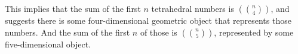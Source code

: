 \documentclass[12pt]{scrippsthesis}
\newcommand{\mchoose}[2]{{\textstyle \left( \! {#1 \choose #2} \! \right)}}
\theoremstyle{definition}
\theoremstyle{remark}
\theoremstyle{plain}
\begin{document}
%
%
%
%
%
%

This implies that the sum of the first $n$ tetrahedral numbers is $\mchoose{n}{4}$, and suggests there is some four-dimensional geometric object that represents those numbers.  And the sum of the first $n$ of those is $\mchoose{n}{5}$, represented by some five-dimensional object.
\end{document}
